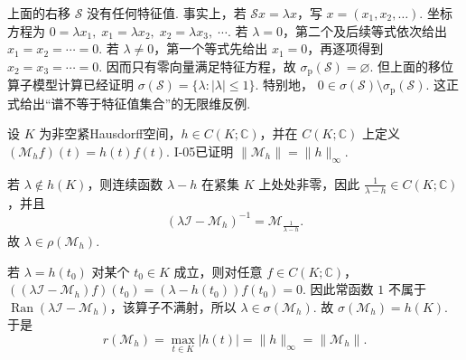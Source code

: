 \begin{FACounterexample}[谱不等于特征值集合]\label{i12:ce-spectrum-noeig}
上面的右移 \(\displaystyle \mathcal S\) 没有任何特征值. 事实上，若 \(\displaystyle \mathcal Sx=\lambda x\)，写 \(\displaystyle x=(x_1,x_2,\dots)\). 坐标方程为
\(\displaystyle 0=\lambda x_1, \; x_1=\lambda x_2, \; x_2=\lambda x_3, \; \cdots.\)
若 \(\displaystyle \lambda=0\)，第二个及后续等式依次给出 \(\displaystyle x_1=x_2=\cdots=0\). 若 \(\displaystyle \lambda\neq0\)，第一个等式先给出 \(\displaystyle x_1=0\)，再逐项得到 \(\displaystyle x_2=x_3=\cdots=0\). 因而只有零向量满足特征方程，故
\(\displaystyle \sigma_{\mathrm p}(\mathcal S) = \varnothing\).
但上面的移位算子模型计算已经证明
\(\displaystyle \sigma(\mathcal S) = \{\lambda:|\lambda|\leqslant1\}\).
特别地，
\(\displaystyle 0 \in \sigma(\mathcal S) \setminus \sigma_{\mathrm p}(\mathcal S)\).
这正式给出“谱不等于特征值集合”的无限维反例.
\end{FACounterexample}

\begin{FAExample}[连续函数乘法算子的谱]\label{i12:mult-spectrum}
设 \(\displaystyle K\) 为非空紧Hausdorff空间，\(\displaystyle h\in C(K;\mathbb C)\)，并在 \(\displaystyle C(K;\mathbb C)\) 上定义 \(\displaystyle (\mathcal M_hf)(t)=h(t)f(t)\). I-05已证明 \(\displaystyle \|\mathcal M_h\|=\|h\|_\infty\).

若 \(\displaystyle \lambda\notin h(K)\)，则连续函数 \(\displaystyle \lambda-h\) 在紧集 \(\displaystyle K\) 上处处非零，因此 \(\displaystyle \frac{1}{\lambda-h}\in C(K;\mathbb C)\)，并且
\[
(\lambda\mathcal I-\mathcal M_h)^{-1}
=
\mathcal M_{\frac{1}{\lambda-h}}.
\]
故 \(\displaystyle \lambda\in\rho(\mathcal M_h)\).

若 \(\displaystyle \lambda=h(t_0)\) 对某个 \(\displaystyle t_0\in K\) 成立，则对任意 \(\displaystyle f\in C(K;\mathbb C)\)，
\(\displaystyle ((\lambda\mathcal I-\mathcal M_h)f)(t_0) = (\lambda-h(t_0))f(t_0) = 0\).
因此常函数 \(\displaystyle1\) 不属于 \(\displaystyle \operatorname{Ran}(\lambda\mathcal I-\mathcal M_h)\)，该算子不满射，所以 \(\displaystyle \lambda\in\sigma(\mathcal M_h)\). 故
\(\displaystyle \sigma(\mathcal M_h) = h(K)\).
于是
\[
r(\mathcal M_h)
=
\max_{t\in K}|h(t)|
=
\|h\|_\infty
=
\|\mathcal M_h\|.
\]
\end{FAExample}

